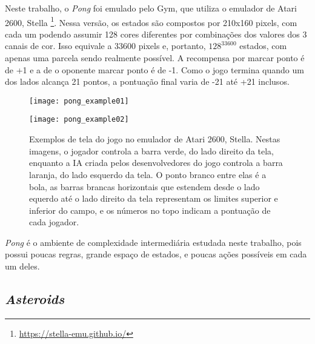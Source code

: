 Neste trabalho, o \textit{Pong} foi emulado pelo Gym, que utiliza o emulador de Atari 2600, Stella \footnote{\url{https://stella-emu.github.io/}}.
Nessa versão, os estados são compostos por 210x160 pixels, com cada um podendo assumir 128 cores diferentes por combinações dos valores dos 3 canais de cor.
Isso equivale a 33600 pixels e, portanto, $128^{33600}$ estados, com apenas uma parcela sendo realmente possível.
A recompensa por marcar ponto é de +1 e a de o oponente marcar ponto é de -1.
Como o jogo termina quando um dos lados alcança 21 pontos, a pontuação final varia de -21 até +21 inclusos.

\begin{figure}[h!]
  \begin{minipage}[b]{.5\textwidth}
  \centering
  \texttt{[image: pong\_example01]}
  \end{minipage}
  \hfill
  \begin{minipage}[b]{.5\textwidth}
  \texttt{[image: pong\_example02]}
  \end{minipage}
  \caption{Exemplos de tela do jogo no emulador de Atari 2600, Stella. Nestas imagens, o jogador controla a barra verde, do lado direito da tela, enquanto a IA criada pelos desenvolvedores do jogo controla a barra laranja, do lado esquerdo da tela. O ponto branco entre elas é a bola, as barras brancas horizontais que estendem desde o lado equerdo até o lado direito da tela representam os limites superior e inferior do campo, e os números no topo indicam a pontuação de cada jogador.}
\end{figure}

\textit{Pong} é o ambiente de complexidade intermediária estudada neste trabalho, pois possui poucas regras, grande espaço de estados, e poucas ações possíveis em cada um deles.

\subsection{\textit{Asteroids}}
\label{sec:env_asteroids}

